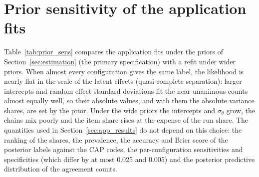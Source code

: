 \section{Prior sensitivity of the application fits}\label{app:prior_sens}
Table~\ref{tab:prior_sens} compares the application fits under the priors of
Section~\ref{sec:estimation} (the primary specification) with a refit under wider priors. When
almost every configuration gives the same label, the likelihood is nearly flat in the scale of the
latent effects (quasi-complete separation): larger intercepts and random-effect standard deviations
fit the near-unanimous counts almost equally well, so their absolute values, and with them the
absolute variance shares, are set by the prior. Under the wide priors the intercepts and
$\sigma_\theta$ grow, the chains mix poorly and the item share rises at the expense of the run
share. The quantities used in Section~\ref{sec:app_results} do not depend on this choice: the
ranking of the shares, the prevalence, the accuracy and Brier score of the posterior labels
against the CAP codes, the per-configuration sensitivities and specificities (which differ by at
most 0.025 and 0.005) and the posterior predictive distribution of the agreement counts.

\FloatBarrier
